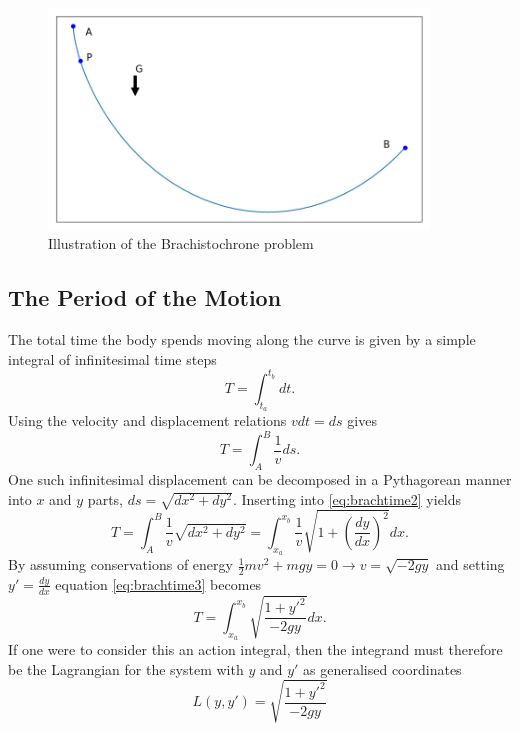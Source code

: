 \documentclass[11pt]{amsart}
\begin{document}
\begin{figure}
\centering
	\includegraphics[width=0.9\textwidth]{pearl_on_string.png}
	\caption{Illustration of the Brachistochrone problem}
	\label{fig:brach}
\end{figure}

\subsection{The Period of the Motion}
The total time the body spends moving along the curve is given by a simple integral of infinitesimal time steps
\begin{equation}
T = \int_{t_a}^{t_b}dt.
\end{equation}
Using the velocity and displacement relations $vdt = ds$ gives
\begin{equation}
\label{eq:brachtime2}
T = \int_{A}^{B}\frac{1}{v}ds.
\end{equation}
One such infinitesimal displacement can be decomposed in a Pythagorean manner into $x$ and $y$ parts, $ds = \sqrt{dx^2 + dy^2}$. Inserting into \ref{eq:brachtime2} yields
\begin{equation}
\label{eq:brachtime3}
T = \int_{A}^{B}\frac{1}{v}\sqrt{dx^2 + dy^2} = \int_{x_a}^{x_b}\frac{1}{v}\sqrt{1 + \left(\frac{dy}{dx} \right)^2}dx.
\end{equation}
By assuming conservations of energy $\frac{1}{2}mv^2 + mgy = 0 \to v = \sqrt{-2gy}$ and setting $y'=\frac{dy}{dx}$ equation \ref{eq:brachtime3} becomes
\begin{equation}
T = \int_{x_a}^{x_b} \sqrt{\frac{1+y'^2}{-2gy}}dx.
\end{equation}
If one were to consider this an action integral, then the integrand must therefore be the Lagrangian for the system with $y$ and $y'$ as generalised coordinates
\begin{equation}
\label{eq:lagrangian}
L(y,y') = \sqrt{\frac{1+y'^2}{-2gy}}
\end{equation}
\end{document}
